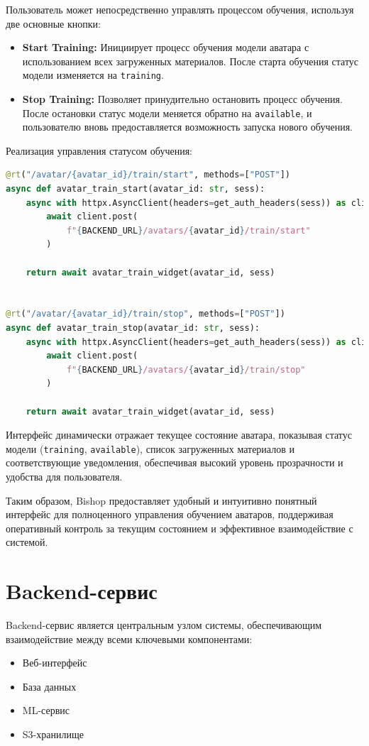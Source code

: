 Пользователь может непосредственно управлять процессом обучения, используя две основные кнопки:

\begin{itemize}
  \item \textbf{Start Training:} Инициирует процесс обучения модели аватара с использованием всех 
        загруженных материалов. После старта обучения статус модели изменяется на 
        \texttt{training}.
  \item \textbf{Stop Training:} Позволяет принудительно остановить процесс обучения. После 
        остановки статус модели меняется обратно на \texttt{available}, и пользователю вновь 
        предоставляется возможность запуска нового обучения.
\end{itemize}


Реализация управления статусом обучения:

\begin{lstlisting}[language=Python, numbers=none, frame=none]
@rt("/avatar/{avatar_id}/train/start", methods=["POST"])
async def avatar_train_start(avatar_id: str, sess):
    async with httpx.AsyncClient(headers=get_auth_headers(sess)) as client:
        await client.post(
            f"{BACKEND_URL}/avatars/{avatar_id}/train/start"
        )

    return await avatar_train_widget(avatar_id, sess)


@rt("/avatar/{avatar_id}/train/stop", methods=["POST"])
async def avatar_train_stop(avatar_id: str, sess):
    async with httpx.AsyncClient(headers=get_auth_headers(sess)) as client:
        await client.post(
            f"{BACKEND_URL}/avatars/{avatar_id}/train/stop"
        )

    return await avatar_train_widget(avatar_id, sess)
\end{lstlisting}


Интерфейс динамически отражает текущее состояние аватара, показывая статус модели (\texttt{training}, 
\texttt{available}), список загруженных материалов и соответствующие уведомления, обеспечивая 
высокий уровень прозрачности и удобства для пользователя.


Таким образом, Bishop предоставляет удобный и интуитивно понятный интерфейс для полноценного управления 
обучением аватаров, поддерживая оперативный контроль за текущим состоянием и эффективное взаимодействие 
с системой.

\section{Backend-сервис}
Backend-сервис является центральным узлом системы, обеспечивающим взаимодействие между всеми ключевыми компонентами:
\begin{itemize}
    \item Веб-интерфейс
    \item База данных
    \item ML-сервис
    \item S3-хранилище
\end{itemize}

